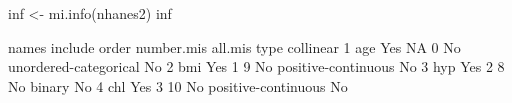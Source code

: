 \begin{Schunk}
\begin{Sinput}
 inf <- mi.info(nhanes2)
 inf
\end{Sinput}
\begin{Soutput}
  names include order number.mis all.mis                  type collinear
1   age     Yes    NA          0      No unordered-categorical        No
2   bmi     Yes     1          9      No   positive-continuous        No
3   hyp     Yes     2          8      No                binary        No
4   chl     Yes     3         10      No   positive-continuous        No
\end{Soutput}
\end{Schunk}

